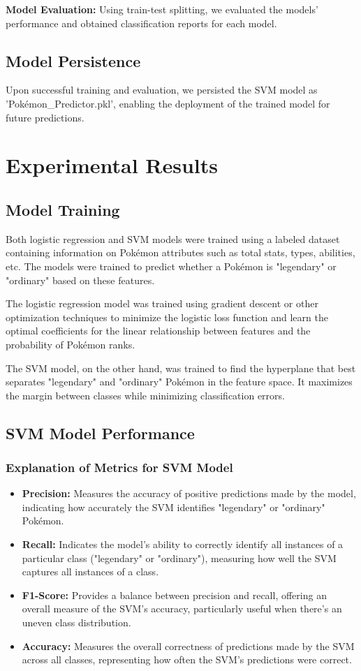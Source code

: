 \documentclass[conference]{IEEEtran}
\begin{document}
\textbf{Model Evaluation:} Using train-test splitting, we evaluated the models' performance and obtained classification reports for each model.

\subsection{Model Persistence}

Upon successful training and evaluation, we persisted the SVM model as 'Pokémon\_Predictor.pkl', enabling the deployment of the trained model for future predictions.

\section{Experimental Results}
\subsection{Model Training}
Both logistic regression and SVM models were trained using a labeled dataset containing information on Pokémon attributes such as total stats, types, abilities, etc. The models were trained to predict whether a Pokémon is "legendary" or "ordinary" based on these features.

The logistic regression model was trained using gradient descent or other optimization techniques to minimize the logistic loss function and learn the optimal coefficients for the linear relationship between features and the probability of Pokémon ranks.

The SVM model, on the other hand, was trained to find the hyperplane that best separates "legendary" and "ordinary" Pokémon in the feature space. It maximizes the margin between classes while minimizing classification errors.

\subsection{SVM Model Performance}
\subsubsection{Explanation of Metrics for SVM Model}
    \begin{itemize}
        \item \textbf{Precision:} Measures the accuracy of positive predictions made by the model, indicating how accurately the SVM identifies "legendary" or "ordinary" Pokémon.
        \item \textbf{Recall:} Indicates the model's ability to correctly identify all instances of a particular class ("legendary" or "ordinary"), measuring how well the SVM captures all instances of a class.
        \item \textbf{F1-Score:} Provides a balance between precision and recall, offering an overall measure of the SVM's accuracy, particularly useful when there's an uneven class distribution.
        \item \textbf{Accuracy:} Measures the overall correctness of predictions made by the SVM across all classes, representing how often the SVM's predictions were correct.
    \end{itemize}
\end{document}
